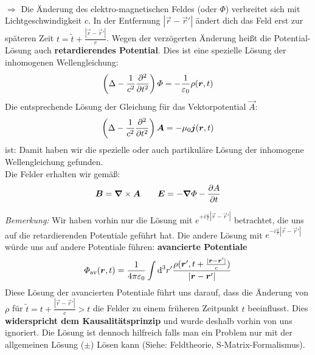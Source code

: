 \\
$ \Rightarrow $ Die Änderung des elektro-magnetischen Feldes (oder $ \Phi $) verbreitet sich mit Lichtgeschwindigkeit $ c $. In der Entfernung $ |\vec{r} - \vec{r}'| $ ändert dich das Feld erst zur späteren Zeit $ t = \tilde{t} + \frac{|\vec{r} - \vec{r}'|}{c} $. Wegen der verzögerten Änderung heißt die Potential-Lösung auch \textbf{retardierendes Potential}.
\vspace{5pt}
\noindent
Dies ist eine spezielle Lösung der inhomogenen Wellengleichung:
\begin{equation*}
\left(\Delta - \frac{1}{c^2} \frac{\partial ^2}{\partial t^2}\right) \varPhi = - \frac{1}{\varepsilon_0} \rho(\bm{r},t)
\end{equation*}
Die entsprechende Lösung der Gleichung für das Vektorpotential $ \vec{A} $:
\begin{equation*}
\left(\Delta - \frac{1}{c^2} \frac{\partial ^2}{\partial t^2}\right) \bm{A} = - \mu_0 \bm{j}(\bm{r},t)
\end{equation*}
ist:
\vspace{5pt}
\noindent
Damit haben wir die spezielle oder auch partikuläre Lösung der inhomogene Wellengleichung gefunden.\\[10pt]
Die Felder erhalten wir gemäß:
\begin{equation*}
\bm{B} = \bm{\nabla} \times \bm{A} \qquad \bm{E} = - \bm{\nabla} \varPhi - \frac{\partial A}{\partial t}
\end{equation*}
\vspace{10pt}

\noindent
\emph{Bemerkung:} Wir haben vorhin nur die Lösung mit $ e^{+ i \frac{\omega}{c} |\vec{r} - \vec{r}'|} $ betrachtet, die uns auf die retardierenden Potentiale geführt hat. Die andere Lösung mit $ e^{- i \frac{\omega}{c} |\vec{r} - \vec{r}'|} $ würde uns auf andere Potentiale führen: \textbf{avancierte Potentiale}
\begin{equation*}
\varPhi_{\textrm{av}} (\bm{r},t) = \frac{1}{4\pi\varepsilon_0} \int \textrm{d}^3 r' \frac{\rho(\bm{r}', t + \frac{|\bm{r} - \bm{r}'|}{c})}{|\bm{r} - \bm{r}'|}
\end{equation*}
Diese Lösung der avancierten Potentiale führt uns darauf, dass die Änderung von $ \rho $ für $ \tilde{t} = t + \frac{|\vec{r} - \vec{r}'|}{c} > t $ die Felder zu einem früheren Zeitpunkt $ t $ beeinflusst. Dies \textbf{widerspricht dem Kausalitätsprinzip} und wurde deshalb vorhin von uns ignoriert. Die Lösung ist dennoch hilfreich falls man ein Problem nur mit der allgemeinen Lösung ($ \pm $) Lösen kann (Siehe: Feldtheorie, S-Matrix-Formalismus).\\

